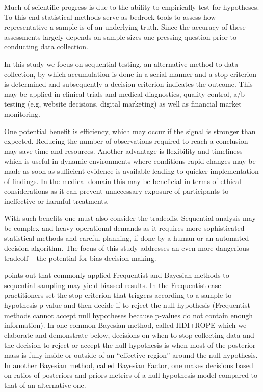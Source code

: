 Much of scientific progress is due to the ability to empirically test for hypotheses.
To this end statistical methods serve as bedrock tools to assess how representative a
sample is of an underlying truth. Since the accuracy of these assessments largely
depends on sample sizes one pressing question prior to conducting data collection.


In this study we focus on sequential testing, an alternative method to data
collection, by which  accumulation is done in a serial manner and a stop criterion is
determined and subsequently a decision criterion indicates the outcome.
This may be applied in clinical trials and medical diagnostics, quality control,
a/b testing (e.g, website decisions, digital marketing) as well as financial market
monitoring.

One potential benefit is efficiency, which may occur if the signal is stronger than
expected. Reducing the number of observations required to reach a conclusion may save
time and resources. Another advantage is flexibility and timeliness which
is useful in dynamic environments where conditions rapid changes may be
made as soon as sufficient evidence is available leading to quicker implementation of
findings. In the medical domain this may be
beneficial in terms of ethical considerations as it can prevent unnecessary exposure of
participants to ineffective or harmful treatments. 

With such benefits one must also consider the tradeoffs. Sequential analysis may be
complex and heavy operational demands as it requires more sophisticated statistical
methods and careful planning, if done by a human or an automated decision algorithm.
The focus of this study addresses an even more dangerious tradeoff --
the potential for bias decision making.

\cite{kruschke2015doing} points out that commonly applied Frequentist and Bayesian
methods to sequential sampling may yield biassed results. In the Frequentist case
practitioners set the stop criterion that triggers according to a sample to
hypothesis p-value and then decide if to reject the null hypothesis
(Frequentist methods cannot accept null hypotheses because p-values do not contain
enough information). In one  common Bayesian method, called HDI+ROPE which we elaborate
and demonstrate below, decisions on when to stop collecting data and the decision to
reject or accept the null hypothesis is when most of the posterior mass is fully inside
or outside of an “effective region” around the null hypothesis. In another Bayesian
method, called Bayesian Factor, one makes decisions based on ratios of posteriors and
priors metrics of a null hypothesis model compared to that of an alternative one.

